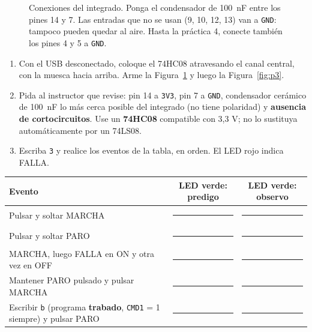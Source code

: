 \documentclass[11pt,a4paper]{article}
\newcommand{\sig}[1]{\texttt{#1}}
\newcommand{\linea}[1][3cm]{\rule{#1}{0.4pt}}
\begin{document}
\begin{figure}[H]\centering
{}
\caption{Conexiones del integrado. Ponga el condensador de \SI{100}{nF} entre los pines 14 y 7. Las entradas que no se usan (9, 10, 12, 13) van a \sig{GND}: tampoco pueden quedar al aire. Hasta la práctica 4, conecte también los pines 4 y 5 a \sig{GND}.}
\label{fig:pinout}
\end{figure}


\begin{enumerate}
  \item Con el USB desconectado, coloque el 74HC08 atravesando el canal central, con la muesca hacia arriba. Arme la Figura~\ref{fig:pinout} y luego la Figura~\ref{fig:p3}.
  \item Pida al instructor que revise: pin 14 a \sig{3V3}, pin 7 a \sig{GND}, condensador cerámico de \SI{100}{nF} lo más cerca posible del integrado (no tiene polaridad) y \textbf{ausencia de cortocircuitos}. Use un \textbf{74HC08} compatible con 3,3 V; no lo sustituya automáticamente por un 74LS08.
  \item Escriba \texttt{3} y realice los eventos de la tabla, en orden. El LED rojo indica FALLA.
\end{enumerate}

\begin{center}\small\renewcommand{\arraystretch}{1.45}
\begin{tabularx}{\linewidth}{@{}X c c@{}}
\toprule
\textbf{Evento} & \textbf{LED verde: predigo} & \textbf{LED verde: observo}\\
\midrule
Pulsar y soltar MARCHA & \linea[1.6cm] & \linea[1.6cm]\\
Pulsar y soltar PARO & \linea[1.6cm] & \linea[1.6cm]\\
MARCHA, luego FALLA en ON y otra vez en OFF & \linea[1.6cm] & \linea[1.6cm]\\
Mantener PARO pulsado y pulsar MARCHA & \linea[1.6cm] & \linea[1.6cm]\\
Escribir \texttt{b} (programa \textbf{trabado}, \sig{CMD1} = 1 siempre) y pulsar PARO & \linea[1.6cm] & \linea[1.6cm]\\
\bottomrule
\end{tabularx}
\end{center}
\end{document}
